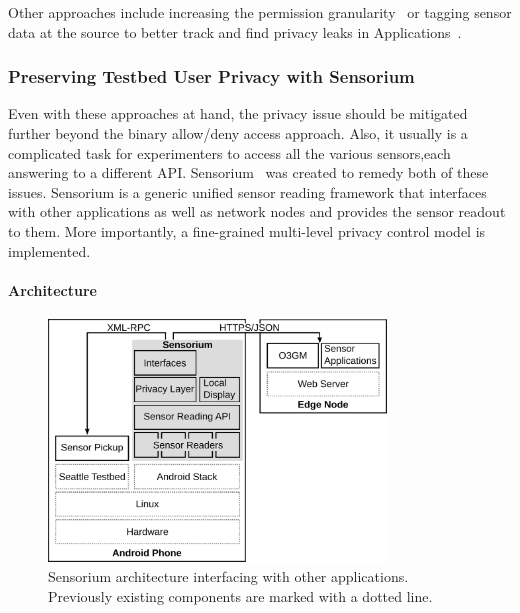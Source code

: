 Other approaches include increasing the permission granularity~\cite{Jeon:2012:DAM:2381934.2381938} or tagging sensor data at the source to better track and find privacy leaks in Applications~\cite{enck2010taintdroid}.



\subsubsection{Preserving Testbed User Privacy with Sensorium}

Even with these approaches at hand, the privacy issue should be mitigated further beyond the binary allow/deny access approach. Also, it usually is a complicated task for experimenters to access all the various sensors,each answering to a different \gls{API}. Sensorium~\cite{raf2013sensorium} was created to remedy both of these issues. Sensorium is a generic unified sensor reading framework that interfaces with other applications as well as network nodes and provides the sensor readout to them. More importantly, a fine-grained multi-level privacy control model is implemented.


\paragraph{Architecture}

\begin{figure}[htb]
	\centering
	\includegraphics[width=0.8\textwidth]{images/sensorium-arch.pdf}
	\caption{Sensorium architecture interfacing with other applications. Previously existing components are marked with a dotted line.}
\label{c5:fig:architecture}
\end{figure}


